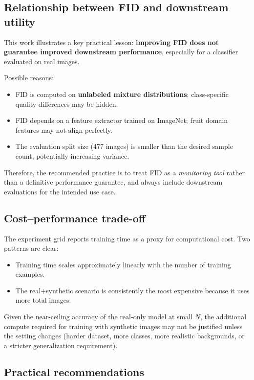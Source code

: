 \subsection{Relationship between FID and downstream utility}

This work illustrates a key practical lesson: \textbf{improving FID does not guarantee improved downstream performance}, especially for a classifier evaluated on real images.

Possible reasons:
\begin{itemize}
\item FID is computed on \textbf{unlabeled mixture distributions}; class-specific quality differences may be hidden.
\item FID depends on a feature extractor trained on ImageNet; fruit domain features may not align perfectly.
\item The evaluation split size (477 images) is smaller than the desired sample count, potentially increasing variance.
\end{itemize}

Therefore, the recommended practice is to treat FID as a \emph{monitoring tool} rather than a definitive performance guarantee, and always include downstream evaluations for the intended use case.

\subsection{Cost--performance trade-off}

The experiment grid reports training time as a proxy for computational cost. Two patterns are clear:
\begin{itemize}
\item Training time scales approximately linearly with the number of training examples.
\item The real+synthetic scenario is consistently the most expensive because it uses more total images.
\end{itemize}

Given the near-ceiling accuracy of the real-only model at small \(N\), the additional compute required for training with synthetic images may not be justified unless the setting changes (harder dataset, more classes, more realistic backgrounds, or a stricter generalization requirement).

\subsection{Practical recommendations}

